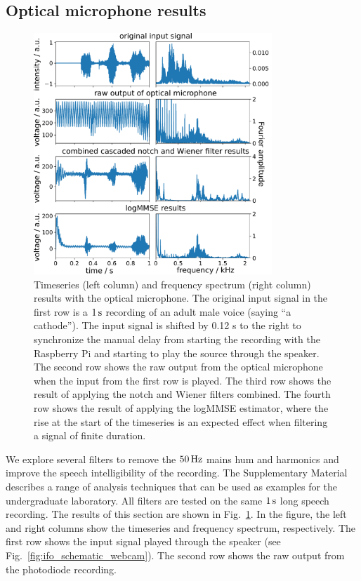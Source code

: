 \documentclass[paper-main.tex]{subfiles}
\begin{document}
\subsection{Optical microphone results}
\label{sec:opticalMicResults}

\begin{figure}
\begin{center}
\includegraphics[width=0.8\textwidth]{figures/combined_highlight_results_melatos_labelled.pdf}
\caption{\label{fig:notchWienerLogMMSEResults}
Timeseries (left column) and frequency spectrum (right column) results with the optical microphone. 
The original input signal in the first row is a $1\,{\rm s}$ recording of an adult male voice (saying ``a cathode''). 
 The input signal is shifted by 0.12 s to the right to synchronize the manual delay from starting the recording with the Raspberry Pi and starting to play the source through the speaker. 
The second row shows the raw output from the optical microphone when the input from the first row is played. 
The third row shows the result of applying the notch and Wiener filters combined. 
The fourth row shows the result of applying the logMMSE estimator, where the rise at the start of the timeseries is an expected effect when filtering a signal of finite duration. 
}
\end{center}
\end{figure}


We explore several filters to remove the $50\,{\rm Hz}$ mains hum and harmonics and improve the speech intelligibility of the recording.
The Supplementary Material describes a range of analysis techniques that can be used as examples for the undergraduate laboratory. 
All filters are tested on the same $1\,{\rm s}$ long speech recording.
The results of this section are shown in Fig.~\ref{fig:notchWienerLogMMSEResults}. 
In the figure, the left and right columns show the timeseries and frequency spectrum, respectively. 
The first row shows the input signal played through the speaker (see Fig.~\ref{fig:ifo_schematic_webcam}). 
The second row shows the raw output from the photodiode recording. 
\end{document}
